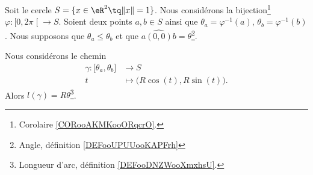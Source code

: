 \begin{proposition}     \label{PROPooDMSTooEOFExj}
	Soit le cercle \( S=\{ x\in \eR^2\tq \| x \|=1 \}\). Nous considérons la bijection\footnote{Corolaire \ref{CORooAKMKooORqcrO}.} \( \varphi\colon \mathopen[ 0 , 2\pi \mathclose[\to S\). Soient deux points \( a,b\in S\) ainsi que \( \theta_a=\varphi^{-1}(a)\), \( \theta_b=\varphi^{-1}(b)\). Nous supposons que \( \theta_a\leq \theta_b\) et que \( \widehat{a(0,0)b}=\theta\)\footnote{Angle, définition \ref{DEFooUPUUooKAPFrh}}.

	Nous considérons le chemin
	\begin{equation}
		\begin{aligned}
			\gamma\colon \mathopen[ \theta_a , \theta_b \mathclose] & \to S                                  \\
			t                                                       & \mapsto \big( R\cos(t),R\sin(t) \big).
		\end{aligned}
	\end{equation}
	Alors \( l(\gamma)=R\theta\)\footnote{Longueur d'arc, définition \ref{DEFooDNZWooXmxhsU}.}.
\end{proposition}

